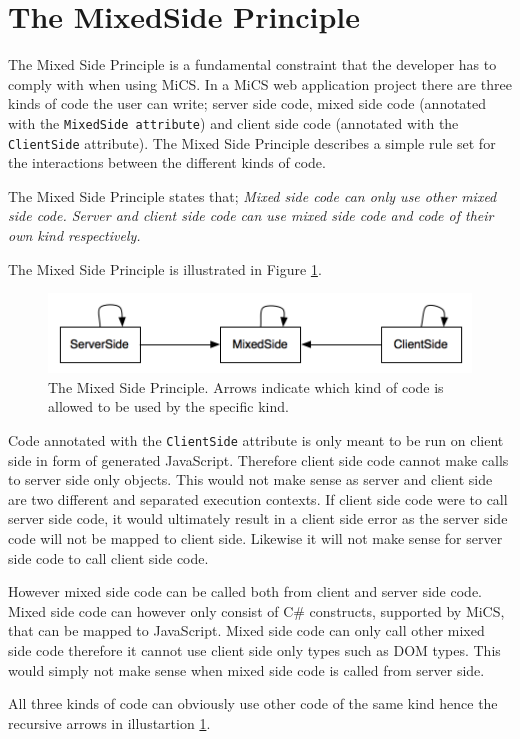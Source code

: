 	\section{The MixedSide Principle} %
	\label{sub:the_mixedside_principle}
		The Mixed Side Principle is a fundamental constraint that the developer has to comply with when using MiCS. In a MiCS web application project there are three kinds of code the user can write; server side code, mixed side code (annotated with the \texttt{MixedSide attribute}) and client side code (annotated with the \texttt{ClientSide} attribute). The Mixed Side Principle describes a simple rule set for the interactions between the different kinds of code. 

		The Mixed Side Principle states that; \emph{Mixed side code can only use other mixed side code. Server and client side code can use mixed side code and code of their own kind respectively.}

		The Mixed Side Principle is illustrated in Figure \ref{fig:MixedSidePrinciple}.

		\begin{figure}[H]
			\begin{center}
				\centerline{\includegraphics[width=12cm]{resources/images/MixedSidePrinciple.png}}
			\end{center}
			\caption{The Mixed Side Principle. Arrows indicate which kind of code is allowed to be used by the specific kind.}
			\label{fig:MixedSidePrinciple}
		\end{figure}

		Code annotated with the \texttt{ClientSide} attribute is only meant to be run on client side in form of generated JavaScript. Therefore client side code cannot make calls to server side only objects. This would not make sense as server and client side are two different and separated execution contexts.  If client side code were to call server side code, it would ultimately result in a client side error as the server side code will not be mapped to client side. Likewise it will not make sense for server side code to call client side code.

		However mixed side code can be called both from client and server side code. Mixed side code can however only consist of C\# constructs, supported by MiCS, that can be mapped to JavaScript. Mixed side code can only call other mixed side code therefore it cannot use client side only types such as DOM types. This would simply not make sense when mixed side code is called from server side.

		All three kinds of code can obviously use other code of the same kind hence the recursive arrows in illustartion \ref{fig:MixedSidePrinciple}.